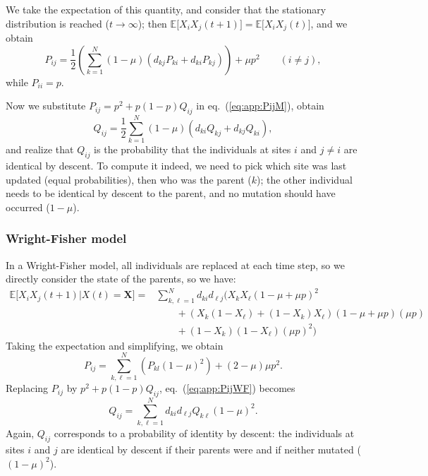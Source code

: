 \documentclass[11pt, letterpaper]{article}
\renewcommand{\eqref}[1]{\textup{{\normalfont eq.~(\ref{#1}}\normalfont)}}
\newcommand{\Esp}[1]{\mathbb{E}\big[ #1\big]}%
\begin{document}
We take the expectation of this quantity, and consider that the stationary distribution is reached ($t\to \infty$); then $\Esp{X_iX_j(t+1)} = \Esp{X_i X_j (t)}$, and we obtain
%
\begin{equation}\label{eq:app:PijM}
P_{ij} = \frac{1}{2} \left(\sum_{k=1}^N (1-\mu) \left( d_{kj} P_{ki} + d_{ki} P_{kj}\right) \right) + \mu p^2 \qquad (i\neq j ),
\end{equation} 
while $P_{ii}=p$. 

Now we substitute $P_{ij} = p^2 + p (1-p) Q_{ij}$ in \eqref{eq:app:PijM}, obtain
\begin{equation}\label{eq:app:QijM}
Q_{ij} = \frac{1}{2} \sum_{k=1}^N (1-\mu) \left( d_{ki} Q_{kj} + d_{kj} Q_{ki}\right),
\end{equation}
and realize that $Q_{ij}$ is the probability that the individuals at sites $i$ and $j \neq i$ are identical by descent. To compute it indeed, we need to pick which site was last updated (equal probabilities), then who was the parent ($k$); the other individual needs to be identical by descent to the parent, and no mutation should have occurred ($1-\mu$). 

\subsubsection{Wright-Fisher model}

In a Wright-Fisher model, all individuals are replaced at each time step, so we directly consider the state of the parents, so we have:
\begin{align}\label{eq:app:PijWF1}
 \Esp{X_iX_j(t+1)|X(t)=\mathbf{X}} = & \sum_{k, \ell = 1}^N  d_{ki} d_{\ell j} \Bigg( X_k X_{\ell} (1-\mu+\mu p)^2 \nonumber\\ & \qquad + \left( X_k (1-X_{\ell}) + (1-X_k) X_{\ell} \right) (1-\mu+\mu p) (\mu p) \nonumber\\
 & \qquad + (1-X_k)(1-X_{\ell}) (\mu p)^2 \Bigg)
\end{align}
Taking the expectation and simplifying, we obtain
\begin{equation}\label{eq:app:PijWF}
P_{ij} = \sum_{k, \ell = 1}^N \left( P_{kl} (1-\mu)^2  \right)+ (2-\mu)\mu p^2. 
\end{equation}
Replacing $P_{ij}$ by $p^2 + p (1-p) Q_{ij}$, \eqref{eq:app:PijWF} becomes
\begin{equation}\label{eq:app:QijWF}
Q_{ij} = \sum_{k, \ell=1}^N d_{ki} d_{\ell j} Q_{k\ell} (1-\mu)^2. 
\end{equation}
Again, $Q_{ij}$ corresponds to a probability of identity by descent: the individuals at sites $i$ and $j$ are identical by descent if their parents were and if neither mutated ($(1-\mu)^2$). 
\end{document}
